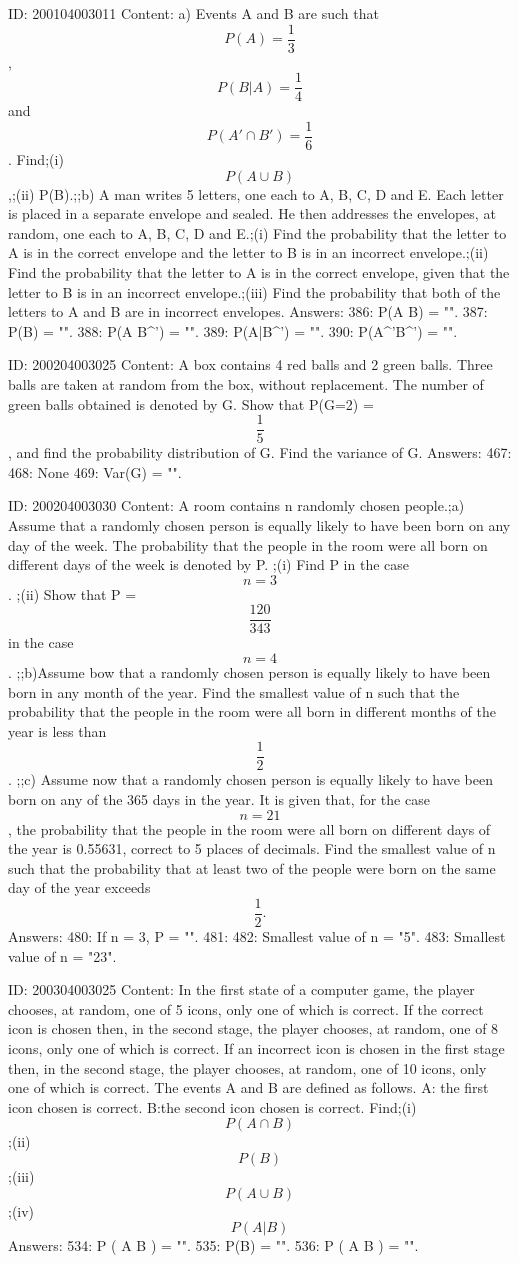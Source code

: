 \documentclass{article}
\begin{document}
ID: 200104003011
Content:
a)  Events A and B are such that  $$P(A) = \frac{1}{3}$$,  $$P(B|A) = \frac{1}{4}$$ and  $$P( A' \cap B' ) = \frac{1}{6}$$. Find;(i)  $$P( A \cup B )$$,;(ii) P(B).;;b) A man writes 5 letters, one each to A, B, C, D and E. Each letter is placed in a separate envelope and sealed. He then addresses the envelopes, at random, one each to A, B, C, D and E.;(i) Find the probability that the letter to A is in the correct envelope and the letter to B is in an incorrect envelope.;(ii) Find the probability that the letter to A is in the correct envelope, given that the letter to B is in an incorrect envelope.;(iii) Find the probability that both of the letters to A and B are in incorrect envelopes.  Answers:
386: P(A \cup B) = "".
387: P(B) = "".
388: P(A \cap B^{'}) = "".
389: P(A|B^{'}) = "".
390: P(A^{'}\cap B^{'}) = "".

ID: 200204003025
Content:
A box contains 4 red balls and 2 green balls. Three balls are taken at random from the box, without replacement. The number of green balls obtained is denoted by G. Show that P(G=2) = $$\frac{1}{5}$$, and find the probability distribution of G. Find the variance of G. Answers:
467: 
468: None
469: Var(G) = "".

ID: 200204003030
Content:
A room contains n randomly chosen people.;a) Assume that a randomly chosen person is equally likely to have been born on any day of the week. The probability that the people in the room were all born on different days of the week is denoted by P.   ;(i) Find P in the case $$n = 3$$.  ;(ii) Show that P = $$\frac{120}{343}$$ in the case $$n = 4$$.  ;;b)Assume bow that a randomly chosen person is equally likely to have been born in any month of the year. Find the smallest value of n such that the probability that the people in the room were all born in different months of the year is less than $$\frac{1}{2}$$. ;;c) Assume now that a randomly chosen person is equally likely to have been born on any of the 365 days in the year. It is given that, for the case $$n = 21$$, the probability that the people in the room were all born on different days of the year is 0.55631, correct to 5 places of decimals. Find the smallest value of n such that the probability that at least two of the people were born on the same day of the year exceeds $$\frac{1}{2}.$$  Answers:
480: If n = 3, P = "".
481: 
482: Smallest value of n = "5".
483: Smallest value of n = "23".

ID: 200304003025
Content:
In the first state of a computer game, the player chooses, at random, one of 5 icons, only one of which is correct. If the correct icon is chosen then, in the second stage, the player chooses, at random, one of 8 icons, only one of which is correct. If an incorrect icon is chosen in the first stage then, in the second stage, the player chooses, at random, one of 10 icons, only one of which is correct. The events A and B are defined as follows. A: the first icon chosen is correct. B:the second icon chosen is correct. Find;(i) $$P(A \cap B)$$;(ii) $$P(B)$$;(iii) $$P(A \cup B)$$;(iv) $$P(A|B)$$Answers:
534: P ( A \cap B )  = "".
535: P(B) = "".
536: P ( A \cup B )  = "".
\end{document}

